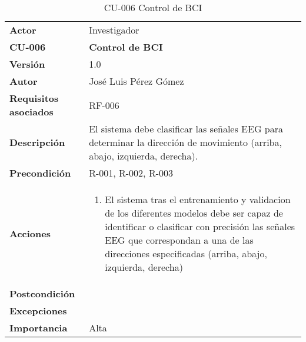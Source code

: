 \begin{table}[p]
	\centering
	\begin{tabularx}{\linewidth}{ p{} p{} }
		\toprule
		\textbf{Actor}              & Investigador    \\
		\textbf{CU-006}    & \textbf{Control de BCI}\\
		\toprule
		\textbf{Versión}              & 1.0    \\
		\textbf{Autor}                & José Luis Pérez Gómez \\
		\textbf{Requisitos asociados} & RF-006 \\
		\textbf{Descripción}          & El sistema debe clasificar las señales EEG para determinar la dirección de movimiento (arriba, abajo, izquierda, derecha).\\
		\textbf{Precondición}         & R-001, R-002, R-003\\
		\textbf{Acciones}             &
		\begin{enumerate}
			\def\labelenumi{\arabic{enumi}.}
			\tightlist
			\item El sistema tras el entrenamiento y validacion de los diferentes modelos debe ser capaz de identificar o clasificar con precisión las señales EEG que correspondan a una de las direcciones especificadas (arriba, abajo, izquierda, derecha)
			
		\end{enumerate}\\
		\textbf{Postcondición}        & \\
		\textbf{Excepciones}          &  \\
		\textbf{Importancia}          & Alta \\
		\bottomrule
	\end{tabularx}
	\caption{CU-006 Control de BCI}
\end{table}


